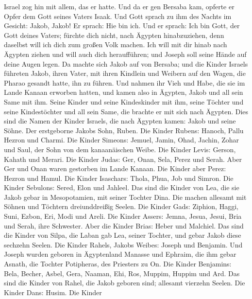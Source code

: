  Israel zog hin mit allem, das er hatte. Und da er gen
Bersaba kam, opferte er Opfer dem Gott seines Vaters Isaak. 
Und Gott sprach zu ihm des Nachts im Gesicht: Jakob, Jakob! Er sprach:
Hie bin ich.  Und er sprach: Ich bin Gott, der Gott deines
Vaters; fürchte dich nicht, nach Ägypten hinabzuziehen, denn daselbst
will ich dich zum großen Volk machen.  Ich will mit dir
hinab nach Ägypten ziehen und will auch dich heraufführen; und Joseph
soll seine Hände auf deine Augen legen.  Da machte sich
Jakob auf von Bersaba; und die Kinder Israels führeten Jakob, ihren
Vater, mit ihren Kindlein und Weibern auf den Wagen, die Pharao gesandt
hatte, ihn zu führen.  Und nahmen ihr Vieh und Habe, die sie
im Lande Kanaan erworben hatten, und kamen also in Ägypten, Jakob und
all sein Same mit ihm.  Seine Kinder und seine Kindeskinder
mit ihm, seine Töchter und seine Kindestöchter und all sein Same, die
brachte er mit sich nach Ägypten.  Dies sind die Namen der
Kinder Israels, die nach Ägypten kamen: Jakob und seine Söhne. Der
erstgeborne Jakobs Sohn, Ruben.  Die Kinder Rubens: Hanoch,
Pallu Hezron und Charmi.  Die Kinder Simeons: Jemuel,
Jamin, Ohad, Jachin, Zohar und Saul, der Sohn von dem kanaanäischen
Weibe.  Die Kinder Levis: Gerson, Kahath und Merari.
 Die Kinder Judas: Ger, Onan, Sela, Perez und Serah. Aber
Ger und Onan waren gestorben im Lande Kanaan. Die Kinder aber Perez:
Hezron und Hamul.  Die Kinder Isaschars: Thola, Phua, Job
und Simron.  Die Kinder Sebulons: Sered, Elon und Jahleel.
 Das sind die Kinder von Lea, die sie Jakob gebar in
Mesopotamien, mit seiner Tochter Dina. Die machen allesamt mit Söhnen
und Töchtern dreiunddreißig Seelen.  Die Kinder Gads:
Ziphion, Haggi, Suni, Ezbon, Eri, Modi und Areli.  Die
Kinder Assers: Jemna, Jesua, Jesui, Bria und Serah, ihre Schwester. Aber
die Kinder Brias: Heber und Malchiel.  Das sind die Kinder
von Silpa, die Laban gab Lea, seiner Tochter, und gebar Jakob diese
sechzehn Seelen.  Die Kinder Rahels, Jakobs Weibes: Joseph
und Benjamin.  Und Joseph wurden geboren in Ägyptenland
Manasse und Ephraim, die ihm gebar Asnath, die Tochter Potipheras, des
Priesters zu On.  Die Kinder Benjamins: Bela, Becher,
Asbel, Gera, Naaman, Ehi, Ros, Muppim, Huppim und Ard.  Das
sind die Kinder von Rahel, die Jakob geboren sind; allesamt vierzehn
Seelen.  Die Kinder Dans: Husim.  Die Kinder
